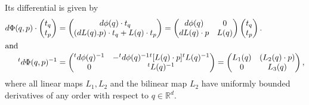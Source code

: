 \documentclass[10pt]{amsart}
\theoremstyle{definition}\newtheorem{defi}[theo]{Definition}\newtheorem{rema}[theo]{Remark}\newtheorem{exam}[theo]{Example}\newtheorem{exem}[theo]{Example}\newtheorem{nota}[theo]{Notation}
\newcommand{\R}{\mathbb{R}}
\begin{document}
Its differential is given by
\begin{align*}
d\Phi(q,p)\cdot
\begin{pmatrix}
t_{q}\\t_{p}
\end{pmatrix}
&=
\begin{pmatrix}
d\phi(q)\cdot t_{q}\\
(dL(q).p)\cdot t_{q}+L(q)\cdot t_{p}
\end{pmatrix} =
\begin{pmatrix}
d\phi(q)&0\\
dL(q)\cdot p&L(q)
\end{pmatrix}
\begin{pmatrix}
t_{q}\\
t_{p}
\end{pmatrix}.
\\
\intertext{and}
{}^{t}d\Phi(q,p)^{-1} &=
\begin{pmatrix}
{}^{t}d\phi(q)^{-1}& -{}^{t}d\phi(q)^{-1}{}^{t}[L(q)\cdot p]{}^{t}L(q)^{-1}\\
0& {}^{t}L(q)^{-1}
\end{pmatrix} =
\begin{pmatrix}
L_{1}(q)& (L_{2}(q)\cdot p)\\
0&L_{3}(q)
\end{pmatrix},
\end{align*}
where all linear maps $L_{1},L_{2}$ and the bilinear map $L_{2}$ have uniformly bounded derivatives of any order with respect to $q\in \R^{d}$.
\end{document}
